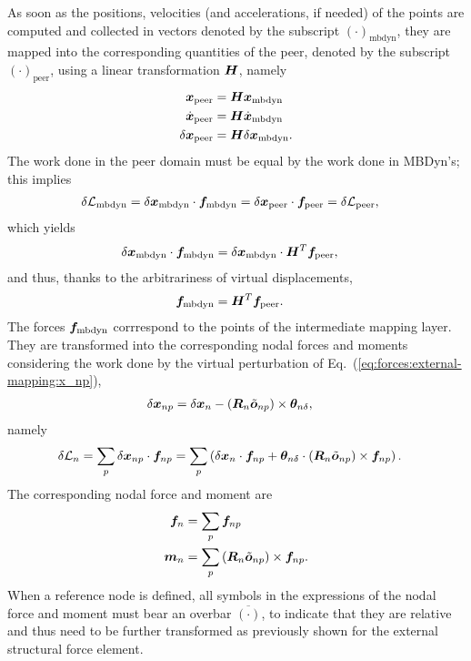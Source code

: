 As soon as the positions, velocities (and accelerations, if needed)
of the points are computed and collected in vectors
denoted by the subscript $(\cdot)_\text{mbdyn}$,
they are mapped into the corresponding quantities
of the peer, denoted by the subscript $(\cdot)_\text{peer}$,
using a linear transformation $\bm{H}$, namely
\begin{align}
	\bm{x}_\text{peer}
	&=
	\bm{H} \bm{x}_\text{mbdyn}
	\\
	\dot{\bm{x}}_\text{peer}
	&=
	\bm{H} \dot{\bm{x}}_\text{mbdyn}
	\\
	\delta\bm{x}_\text{peer}
	&=
	\bm{H} \delta\bm{x}_\text{mbdyn}
	.
\end{align}
The work done in the peer domain must be equal by the work done
in MBDyn's; this implies
\begin{align}
	\delta\mathcal{L}_\text{mbdyn}
	&=
	\delta\bm{x}_\text{mbdyn} \cdot \bm{f}_\text{mbdyn}
	=
	\delta\bm{x}_\text{peer} \cdot \bm{f}_\text{peer}
	=
	\delta\mathcal{L}_\text{peer}
	,
\end{align}
which yields
\begin{align}
	\delta\bm{x}_\text{mbdyn} \cdot \bm{f}_\text{mbdyn}
	&=
	\delta\bm{x}_\text{mbdyn} \cdot \bm{H}^T \bm{f}_\text{peer}
	,
\end{align}
and thus, thanks to the arbitrariness of virtual displacements,
\begin{align}
	\bm{f}_\text{mbdyn}
	&=
	\bm{H}^T \bm{f}_\text{peer}
	.
\end{align}
The forces $\bm{f}_\text{mbdyn}$ corrrespond to the points
of the intermediate mapping layer.
They are transformed into the corresponding nodal forces and moments
considering the work done by the virtual perturbation
of Eq.~(\ref{eq:forces:external-mapping:x_np}),
\begin{align}
	\delta\bm{x}_{np}
	&=
	\delta\bm{x}_n
	-
	\left( \bm{R}_n \tilde{\bm{o}}_{np} \right) \times \bm{\theta}_{n\delta}
	,
\end{align}
namely
\begin{align}
	\delta\mathcal{L}_n
	&=
	\sum_p \delta\bm{x}_{np} \cdot \bm{f}_{np}
	=
	\sum_p \left( 
		\delta\bm{x}_n \cdot \bm{f}_{np}
		+
		\bm{\theta}_{n\delta} \cdot \left( \bm{R}_n \tilde{\bm{o}}_{np} \right) \times \bm{f}_{np}
	 \right)
	.
\end{align}
The corresponding nodal force and moment are
\begin{align}
	\bm{f}_n
	&=
	\sum_p \bm{f}_{np}
	\\
	\bm{m}_n
	&=
	\sum_p \left( \bm{R}_n \tilde{\bm{o}}_{np} \right) \times \bm{f}_{np}
	.
\end{align}
When a reference node is defined, all symbols in the expressions
of the nodal force and moment must bear an overbar $\overline{(\cdot)}$,
to indicate that they are relative and thus need
to be further transformed as previously shown
for the external structural force element.


